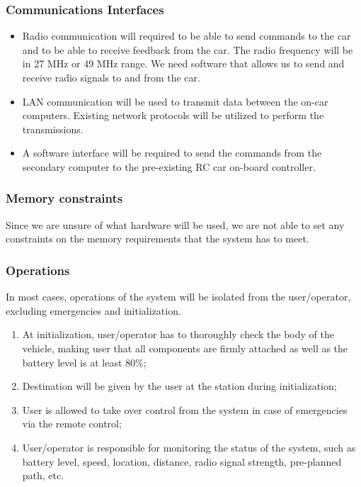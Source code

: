 \documentclass[compsoc,draftclsnofoot,onecolumn,10pt]{IEEEtran}
\begin{document}
\subsubsection{Communications Interfaces} %
\begin{itemize}
	\item Radio communication will required to be able to send commands to the car and
	to be able to receive feedback from the car. The radio frequency will be in 27
	MHz or 49 MHz range. We need software that allows us to send and receive radio
	signals to and from the car. 
	
	\item LAN communication will be used to transmit data between the on-car computers.
	Existing network protocols will be utilized to perform the transmissions.
	
	\item A software interface will be required to send the commands from the
	secondary computer to the pre-existing RC car on-board controller.
	
\end{itemize}


\subsubsection{Memory constraints} %
Since we are unsure of what hardware will be used, we are not able to set any 
constraints on the memory requirements that the system has to meet. 

\subsubsection{Operations} %
In most cases, operations of the system will be isolated from the user/operator,
excluding emergencies and initialization.  
\begin{enumerate}
	\item At initialization, user/operator has to thoroughly check the body of the
	vehicle, making user that all components are firmly attached as well as the 
	battery level is at least 80\%;
	\item Destination will be given by the user at the station during initialization;
	\item User is allowed to take over control from the system in case of emergencies
	via the remote control;
	\item User/operator is responsible for monitoring the status of the system, such as 
	battery level, speed, location, distance, radio signal strength, pre-planned path, 
	etc.
\end{enumerate}
\end{document}
